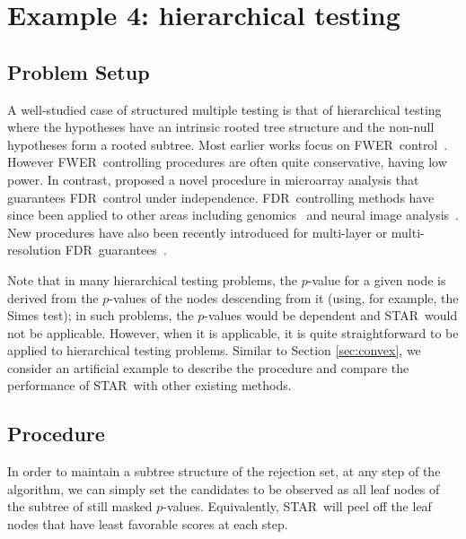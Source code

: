 \documentclass{biometrika}
\newcommand{\textFDR}{FDR}
\newcommand{\textFWER}{FWER}
\renewcommand{\star}{STAR}
\newcommand{\1}{\mathbf{1}}
\begin{document}
\section{Example 4: hierarchical testing}\label{sec:tree}

\subsection{Problem Setup}
A well-studied case of structured multiple testing is that of hierarchical testing where the hypotheses have an intrinsic rooted tree structure and the non-null hypotheses form a rooted subtree. Most earlier works focus on \textFWER ~control~\citep[e.g.,][]{dmitrienko06, meinshausen08, huque08, brechenmacher11, goeman12}. However \textFWER ~controlling procedures are often quite conservative, having low power. 
In contrast, \cite{yekutieli06,yekutieli08} proposed a novel procedure in microarray analysis that guarantees \textFDR ~control under independence. 
\textFDR ~controlling methods  have since been applied to other areas including genomics~\citep[e.g.,][]{heller09, guo10, benjamini14, li14, lynch16} and neural image analysis~\citep[e.g.,][]{benjamini07, singh10, schildknecht16}. New procedures have also been recently introduced for multi-layer or multi-resolution \textFDR ~guarantees~\citep{barber16,peterson16, katsevich17, bogomolov17}.

Note that in many hierarchical testing problems, the $p$-value for a given node is derived from the $p$-values of the nodes descending from it (using, for example, the Simes test); in such problems, the $p$-values would be dependent and \star ~would not be applicable. However, when it is applicable, it is quite straightforward to be applied to hierarchical testing problems. Similar to Section \ref{sec:convex}, we consider an artificial example to describe the procedure and compare the performance of \star ~with other existing methods. 

\subsection{Procedure}\label{subsec:tree_proc}
 In order to maintain a subtree structure of the rejection set, at any step of the algorithm, we can simply set the candidates to be observed as all leaf nodes of the subtree of still masked $p$-values. Equivalently, \star ~will peel off the leaf nodes that have least favorable scores at each step. 
\end{document}
